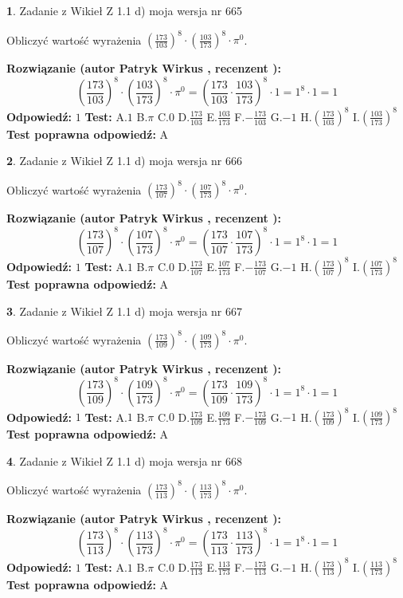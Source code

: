\documentclass[12pt, a4paper]{article}
\theoremstyle{definition} %
\newtheorem{zad}{}
\newcommand{\zadStart}[1]{\begin{zad}#1\newline}
\newcommand{\zadStop}{\end{zad}}
\newcommand{\rozwStart}[2]{\noindent \textbf{Rozwiązanie (autor #1 , recenzent #2): }\newline}
\newcommand{\rozwStop}{\newline}
\newcommand{\odpStart}{\noindent \textbf{Odpowiedź:}\newline}
\newcommand{\odpStop}{\newline}
\newcommand{\testStart}{\noindent \textbf{Test:}\newline}
\newcommand{\testStop}{\newline}
\newcommand{\kluczStart}{\noindent \textbf{Test poprawna odpowiedź:}\newline}
\newcommand{\kluczStop}{\newline}
\begin{document}
\zadStart{Zadanie z Wikieł Z 1.1 d) moja wersja nr 665}

Obliczyć wartość wyrażenia $(\frac{173}{103})^{8} \cdot (\frac{103}{173})^{8} \cdot \pi^{0}$.
\zadStop
\rozwStart{Patryk Wirkus}{}
$$(\frac{173}{103})^{8} \cdot (\frac{103}{173})^{8} \cdot \pi^{0} = (\frac{173}{103} \cdot \frac{103}{173})^{8} \cdot 1 = 1^{8} \cdot 1 = 1$$
\rozwStop
\odpStart
$1$
\odpStop
\testStart
A.$1$ B.$\pi$ C.$0$ D.$\frac{173}{103}$ E.$\frac{103}{173}$
F.$-\frac{173}{103}$ G.$-1$
H.$(\frac{173}{103})^{8}$
I.$(\frac{103}{173})^{8}$
\testStop
\kluczStart
A
\kluczStop



\zadStart{Zadanie z Wikieł Z 1.1 d) moja wersja nr 666}

Obliczyć wartość wyrażenia $(\frac{173}{107})^{8} \cdot (\frac{107}{173})^{8} \cdot \pi^{0}$.
\zadStop
\rozwStart{Patryk Wirkus}{}
$$(\frac{173}{107})^{8} \cdot (\frac{107}{173})^{8} \cdot \pi^{0} = (\frac{173}{107} \cdot \frac{107}{173})^{8} \cdot 1 = 1^{8} \cdot 1 = 1$$
\rozwStop
\odpStart
$1$
\odpStop
\testStart
A.$1$ B.$\pi$ C.$0$ D.$\frac{173}{107}$ E.$\frac{107}{173}$
F.$-\frac{173}{107}$ G.$-1$
H.$(\frac{173}{107})^{8}$
I.$(\frac{107}{173})^{8}$
\testStop
\kluczStart
A
\kluczStop



\zadStart{Zadanie z Wikieł Z 1.1 d) moja wersja nr 667}

Obliczyć wartość wyrażenia $(\frac{173}{109})^{8} \cdot (\frac{109}{173})^{8} \cdot \pi^{0}$.
\zadStop
\rozwStart{Patryk Wirkus}{}
$$(\frac{173}{109})^{8} \cdot (\frac{109}{173})^{8} \cdot \pi^{0} = (\frac{173}{109} \cdot \frac{109}{173})^{8} \cdot 1 = 1^{8} \cdot 1 = 1$$
\rozwStop
\odpStart
$1$
\odpStop
\testStart
A.$1$ B.$\pi$ C.$0$ D.$\frac{173}{109}$ E.$\frac{109}{173}$
F.$-\frac{173}{109}$ G.$-1$
H.$(\frac{173}{109})^{8}$
I.$(\frac{109}{173})^{8}$
\testStop
\kluczStart
A
\kluczStop



\zadStart{Zadanie z Wikieł Z 1.1 d) moja wersja nr 668}

Obliczyć wartość wyrażenia $(\frac{173}{113})^{8} \cdot (\frac{113}{173})^{8} \cdot \pi^{0}$.
\zadStop
\rozwStart{Patryk Wirkus}{}
$$(\frac{173}{113})^{8} \cdot (\frac{113}{173})^{8} \cdot \pi^{0} = (\frac{173}{113} \cdot \frac{113}{173})^{8} \cdot 1 = 1^{8} \cdot 1 = 1$$
\rozwStop
\odpStart
$1$
\odpStop
\testStart
A.$1$ B.$\pi$ C.$0$ D.$\frac{173}{113}$ E.$\frac{113}{173}$
F.$-\frac{173}{113}$ G.$-1$
H.$(\frac{173}{113})^{8}$
I.$(\frac{113}{173})^{8}$
\testStop
\kluczStart
A
\kluczStop
\end{document}
